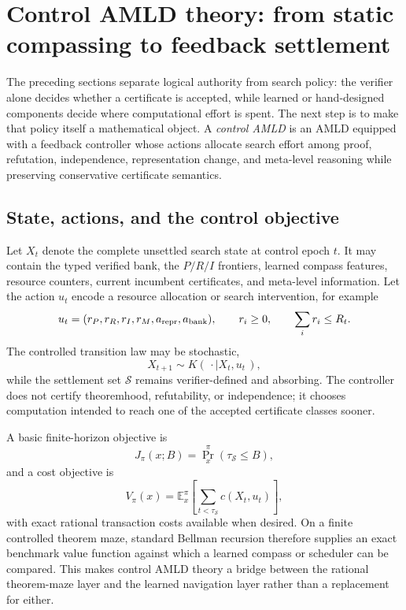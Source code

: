 \section{Control AMLD theory: from static compassing to feedback settlement}
\label{sec:control-amld}

The preceding sections separate logical authority from search policy: the verifier alone decides whether a certificate is accepted, while learned or hand-designed components decide where computational effort is spent. The next step is to make that policy itself a mathematical object. A \emph{control AMLD} is an AMLD equipped with a feedback controller whose actions allocate search effort among proof, refutation, independence, representation change, and meta-level reasoning while preserving conservative certificate semantics.

\subsection{State, actions, and the control objective}
Let $X_t$ denote the complete unsettled search state at control epoch $t$. It may contain the typed verified bank, the $P/R/I$ frontiers, learned compass features, resource counters, current incumbent certificates, and meta-level information. Let the action $u_t$ encode a resource allocation or search intervention, for example
\[
 u_t=(r_P,r_R,r_I,r_M,a_{\rm repr},a_{\rm bank}),
 \qquad r_i\ge 0,\qquad \sum_i r_i\le R_t.
\]
The controlled transition law may be stochastic,
\[
 X_{t+1}\sim K(\,\cdot\mid X_t,u_t\,),
\]
while the settlement set $\mathcal S$ remains verifier-defined and absorbing. The controller does not certify theoremhood, refutability, or independence; it chooses computation intended to reach one of the accepted certificate classes sooner.

A basic finite-horizon objective is
\[
 J_\pi(x;B)=\Pr_x^\pi(\tau_{\mathcal S}\le B),
\]
and a cost objective is
\[
 V_\pi(x)=\mathbb E_x^\pi\!\left[\sum_{t<\tau_{\mathcal S}} c(X_t,u_t)\right],
\]
with exact rational transaction costs available when desired. On a finite controlled theorem maze, standard Bellman recursion therefore supplies an exact benchmark value function against which a learned compass or scheduler can be compared. This makes control AMLD theory a bridge between the rational theorem-maze layer and the learned navigation layer rather than a replacement for either.

